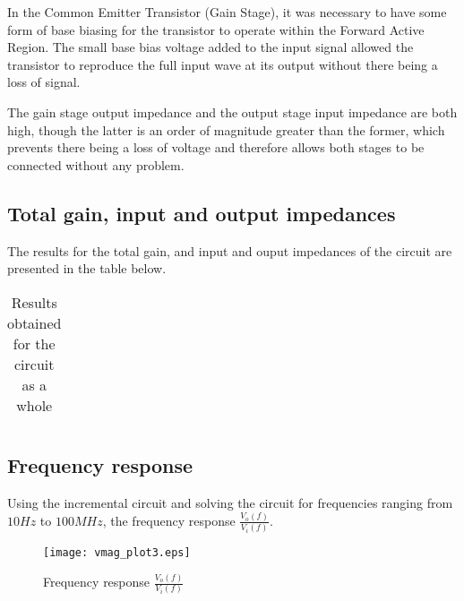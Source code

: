 In the Common Emitter Transistor (Gain Stage), it was necessary to have some form of base biasing for the transistor to operate within the Forward Active Region. The small base bias voltage added to the input signal allowed the transistor to reproduce the full input wave at its output without there being a loss of signal.

The gain stage output impedance and the output stage input impedance are both high, though the latter is an order of magnitude greater than the former, which prevents there being a loss of voltage and therefore allows both stages to be connected without any problem.



\subsection{Total gain, input and output impedances}
The results for the total gain, and input and ouput impedances of the circuit are presented in the table below.

\begin{table}[H]
  \centering
  \begin{tabular}{|c|c|}
    \hline
      
  \end{tabular}
  \caption{Results obtained for the circuit as a whole}
  \label{tab:resultsAC2}
\end{table}


\subsection{Frequency response}
Using the incremental circuit and solving the circuit for frequencies ranging from $10 Hz$ to $100 MHz$, the frequency response $\frac{V_o(f)}{V_i(f)}$.

\begin{figure}[H] \centering
\texttt{[image: vmag\_plot3.eps]}
\caption{Frequency response $\frac{V_o(f)}{V_i(f)}$}
\label{fig:freq_response}
\end{figure}








